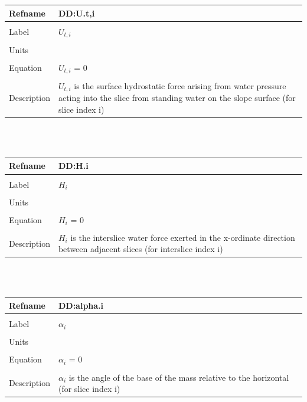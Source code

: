 \documentclass[12pt]{article}
\begin{document}
\noindent \begin{minipage}{\textwidth}
\begin{tabular}{p{} p{}}
\toprule \textbf{Refname} & \textbf{DD:U.t,i}
\label{DD:U.t,i}
\\ \midrule \\
Label & $U_{t,i}$
\\ \midrule \\
Units & 
\\ \midrule \\
Equation & $U_{t,i}$ = $0$
\\ \midrule \\
Description & $U_{t,i}$ is the surface hydrostatic force arising from water pressure acting into the slice from standing water on the slope surface (for slice index i)
\\ \bottomrule \end{tabular}
\end{minipage}\\
~\newline
\noindent \begin{minipage}{\textwidth}
\begin{tabular}{p{} p{}}
\toprule \textbf{Refname} & \textbf{DD:H.i}
\label{DD:H.i}
\\ \midrule \\
Label & $H_{i}$
\\ \midrule \\
Units & 
\\ \midrule \\
Equation & $H_{i}$ = $0$
\\ \midrule \\
Description & $H_{i}$ is the interslice water force exerted in the x-ordinate direction between adjacent slices (for interslice index i)
\\ \bottomrule \end{tabular}
\end{minipage}\\
~\newline
\noindent \begin{minipage}{\textwidth}
\begin{tabular}{p{} p{}}
\toprule \textbf{Refname} & \textbf{DD:alpha.i}
\label{DD:alpha.i}
\\ \midrule \\
Label & $\alpha{}_{i}$
\\ \midrule \\
Units & 
\\ \midrule \\
Equation & $\alpha{}_{i}$ = $0$
\\ \midrule \\
Description & $\alpha{}_{i}$ is the angle of the base of the mass relative to the horizontal (for slice index i)
\\ \bottomrule \end{tabular}
\end{minipage}\\
\end{document}
